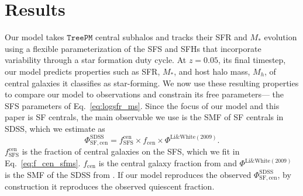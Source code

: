 \documentclass[12pt, letterpaper, preprint, tighten]{aastex62}
\newcommand{\beq}{\begin{equation}}
\newcommand{\eeq}{\end{equation}}
\begin{document}
\section{Results} \label{sec:results} 
Our model takes $\mathtt{TreePM}$ central subhalos and tracks their SFR 
and $M_*$ evolution using a flexible parameterization of the SFS and 
SFHs that incorporate variability through a star formation duty cycle.
At $z = 0.05$, its final timestep, our model predicts properties such 
as SFR, $M_*$, and host halo mass, $M_h$, of central galaxies it 
classifies as star-forming. We now use these resulting properties to compare our 
model to observations and constrain its free parameters--- the 
SFS parameters of Eq.~\ref{eq:logsfr_ms}. Since the focus of our model 
and this paper is SF centrals, the main observable we use is the SMF of 
SF centrals in SDSS, which we estimate as 
\beq \label{eq:smf_sf_cen} 
\Phi^\mathrm{SDSS}_\mathrm{SF,cen} = f^\mathrm{cen}_\mathrm{SFS} \times f_\mathrm{cen} \times \Phi^\mathrm{Li\&White(2009)}.
\eeq
$f^\mathrm{cen}_\mathrm{SFS}$ is the fraction of central galaxies on the 
SFS, which we fit in Eq.~\ref{eq:f_cen_sfms}. $f_\mathrm{cen}$ is the 
central galaxy fraction from \cite{wetzel2013} and $\Phi^\mathrm{Li\&White(2009)}$ 
is the SMF of the SDSS from \cite{li2009}. If our model reproduces the 
observed $\Phi^\mathrm{SDSS}_\mathrm{SF,cen}$, by construction it reproduces 
the observed quiescent fraction. 
\end{document}
